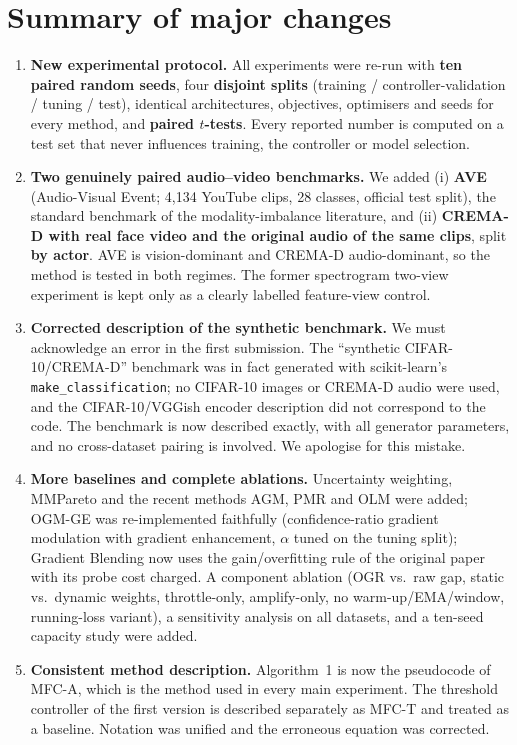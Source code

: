\documentclass[11pt,a4paper]{article}
\begin{document}
\section*{Summary of major changes}
\begin{enumerate}[leftmargin=*]
\item \textbf{New experimental protocol.} All experiments were re-run with \textbf{ten paired random seeds}, four \textbf{disjoint splits} (training / controller-validation / tuning / test), identical architectures, objectives, optimisers and seeds for every method, and \textbf{paired $t$-tests}. Every reported number is computed on a test set that never influences training, the controller or model selection.
\item \textbf{Two genuinely paired audio--video benchmarks.} We added (i) \textbf{AVE} (Audio-Visual Event; 4,134 YouTube clips, 28 classes, official test split), the standard benchmark of the modality-imbalance literature, and (ii) \textbf{CREMA-D with real face video and the original audio of the same clips}, split \textbf{by actor}. AVE is vision-dominant and CREMA-D audio-dominant, so the method is tested in both regimes. The former spectrogram two-view experiment is kept only as a clearly labelled feature-view control.
\item \textbf{Corrected description of the synthetic benchmark.} We must acknowledge an error in the first submission. The ``synthetic CIFAR-10/CREMA-D'' benchmark was in fact generated with scikit-learn's \texttt{make\_classification}; no CIFAR-10 images or CREMA-D audio were used, and the CIFAR-10/VGGish encoder description did not correspond to the code. The benchmark is now described exactly, with all generator parameters, and no cross-dataset pairing is involved. We apologise for this mistake.
\item \textbf{More baselines and complete ablations.} Uncertainty weighting, MMPareto and the recent methods AGM, PMR and OLM were added; OGM-GE was re-implemented faithfully (confidence-ratio gradient modulation with gradient enhancement, $\alpha$ tuned on the tuning split); Gradient Blending now uses the gain/overfitting rule of the original paper with its probe cost charged. A component ablation (OGR vs.\ raw gap, static vs.\ dynamic weights, throttle-only, amplify-only, no warm-up/EMA/window, running-loss variant), a sensitivity analysis on all datasets, and a ten-seed capacity study were added.
\item \textbf{Consistent method description.} Algorithm~1 is now the pseudocode of MFC-A, which is the method used in every main experiment. The threshold controller of the first version is described separately as MFC-T and treated as a baseline. Notation was unified and the erroneous equation was corrected.

\end{enumerate}
\end{document}
